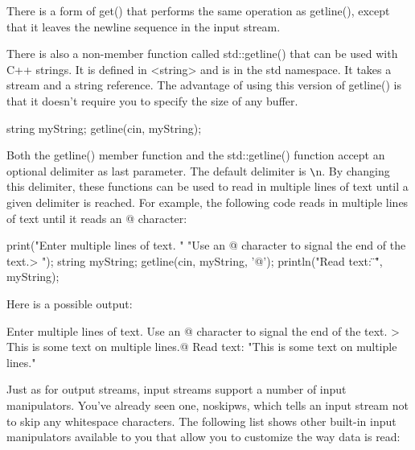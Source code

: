 There is a form of get() that performs the same operation as getline(), except that it leaves the newline sequence in the input stream.

There is also a non-member function called std::getline() that can be used with C++ strings. It is defined in <string> and is in the std namespace. It takes a stream and a string reference. The advantage of using this version of getline() is that it doesn’t require you to specify the size of any buffer.

\begin{cpp}
string myString;
getline(cin, myString);
\end{cpp}

Both the getline() member function and the std::getline() function accept an optional delimiter as last parameter. The default delimiter is \verb|\|n. By changing this delimiter, these functions can be used to read in multiple lines of text until a given delimiter is reached. For example, the following code reads in multiple lines of text until it reads an @ character:

\begin{cpp}
print("Enter multiple lines of text. "
      "Use an @ character to signal the end of the text.\n> ");
string myString;
getline(cin, myString, '@');
println("Read text: \"{}\"", myString);
\end{cpp}

Here is a possible output:

\begin{shell}
Enter multiple lines of text. Use an @ character to signal the end of the text.
> This is some
text on multiple
lines.@
Read text: "This is some
text on multiple
lines."
\end{shell}



Just as for output streams, input streams support a number of input manipulators. You’ve already seen one, noskipws, which tells an input stream not to skip any whitespace characters. The following list shows other built-in input manipulators available to you that allow you to customize the way data is read:

